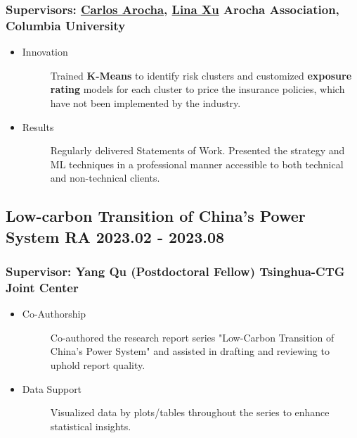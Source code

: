 \documentclass[a4paper]{article}
\begin{document}
\subsubsection{Supervisors: \href{https://www.linkedin.com/in/carocha/?originalSubdomain=ch}{Carlos Arocha}, \href{https://sps.columbia.edu/person/lina-xu}{Lina Xu} \hfill Arocha Association, Columbia University} 
\begin{itemize}
    \item\begin{description}
        \item[Innovation] Trained \textbf{K-Means} to identify risk clusters and customized \textbf{exposure rating} models for each cluster to price the insurance policies, which have not been implemented by the industry.
    \end{description}
    \item\begin{description}
        \item[Results] Regularly delivered Statements of Work. Presented the strategy and ML techniques in a professional manner accessible to both technical and non-technical clients.
    \end{description}
\end{itemize} 

\subsection{Low-carbon Transition of China's Power System \normalfont \hfill RA \hspace{40pt} 2023.02 - 2023.08} 
\subsubsection{Supervisor:  Yang Qu (Postdoctoral Fellow) \hfill Tsinghua-CTG Joint Center} 

\begin{itemize}
    \item \begin{description}
        \item[Co-Authorship] Co-authored the research report series "Low-Carbon Transition of China’s Power System" and assisted in drafting and reviewing to uphold report quality.
    \end{description}
    \item \begin{description}
        \item[Data Support] Visualized data by plots/tables throughout the series to enhance statistical insights.
    \end{description} 
\end{itemize}
\end{document}
